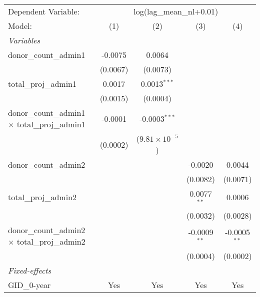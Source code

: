 \begingroup
\centering
\begin{tabular}{lcccc}
   \tabularnewline \midrule \midrule
   Dependent Variable: & \multicolumn{4}{c}{log(lag\_mean\_nl+0.01)}\\
   Model:                                                 & (1)      & (2)                     & (3)            & (4)\\  
   \midrule
   \emph{Variables}\\
   donor\_count\_admin1                                   & -0.0075  & 0.0064                  &                &   \\   
                                                          & (0.0067) & (0.0073)                &                &   \\   
   total\_proj\_admin1                                    & 0.0017   & 0.0013$^{***}$          &                &   \\   
                                                          & (0.0015) & (0.0004)                &                &   \\   
   donor\_count\_admin1 $\times$ total\_proj\_admin1      & -0.0001  & -0.0003$^{***}$         &                &   \\   
                                                          & (0.0002) & ($9.81\times 10^{-5}$)  &                &   \\   
   donor\_count\_admin2                                   &          &                         & -0.0020        & 0.0044\\   
                                                          &          &                         & (0.0082)       & (0.0071)\\   
   total\_proj\_admin2                                    &          &                         & 0.0077$^{**}$  & 0.0006\\   
                                                          &          &                         & (0.0032)       & (0.0028)\\   
   donor\_count\_admin2 $\times$ total\_proj\_admin2      &          &                         & -0.0009$^{**}$ & -0.0005$^{**}$\\   
                                                          &          &                         & (0.0004)       & (0.0002)\\   
   \midrule
   \emph{Fixed-effects}\\
   GID\_0-year                                            & Yes      & Yes                     & Yes            & Yes\\  

\end{tabular}
